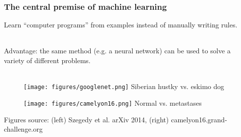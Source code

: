 \documentclass[notes]{beamer}          %
\newif\iffull
\begin{document}
\begin{frame}
\frametitle{The central premise of machine learning}

Learn ``computer programs'' from examples instead of manually writing rules. \\~\

\pause

Advantage: the same method (e.g. a neural network) can be used to solve a variety of different problems. \\~\

\begin{figure}[ht]
        \begin{minipage}[b]{0.45\linewidth}
            \centering
            \texttt{[image: figures/googlenet.png]}
            \small{Siberian hustky vs. eskimo dog}
        \end{minipage}
        \hspace{0.5cm}
        \begin{minipage}[b]{0.35\linewidth}
            \centering
            \texttt{[image: figures/camelyon16.png]}
	    \small{Normal vs. metastases}
        \end{minipage}
\end{figure}
\vfill
\tiny{Figures source: (left) Szegedy et al. arXiv 2014, (right) camelyon16.grand-challenge.org} 
\end{frame}

\iffull
\begin{frame}
\frametitle{The central premise of machine learning}
\begin{center}
\texttt{[image: figures/machine\_learning.png]}
\end{center}
{\tiny Figure source: xkcd.com}
\end{frame}
\fi
\end{document}
